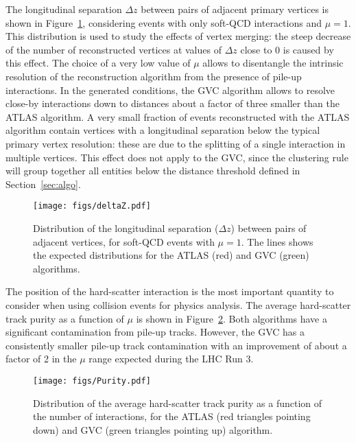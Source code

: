 \documentclass[a4paper,11pt]{article}
\begin{document}
The longitudinal separation $\Delta z$ between pairs of adjacent primary vertices is shown in Figure~\ref{fig:deltaZ}, considering events with only soft-QCD interactions and $\mu = 1$. This distribution is used to study the effects of vertex merging: the steep decrease of the number of reconstructed vertices at values of $\Delta z$ close to 0 is caused by this effect. The choice of a very low value of $\mu$ allows to disentangle the intrinsic resolution of the reconstruction algorithm from the presence of pile-up interactions. In the generated conditions, the GVC algorithm allows to resolve close-by interactions down to distances about a factor of three smaller than the ATLAS algorithm. A very small fraction of events reconstructed with the ATLAS algorithm contain vertices with a longitudinal separation below the typical primary vertex resolution: these are due to the splitting of a single interaction in multiple vertices. This effect does not apply to the GVC, since the clustering rule will group together all entities below the distance threshold defined in Section~\ref{sec:algo}.

\begin{figure}[htb!]
\begin{center}
\texttt{[image: figs/deltaZ.pdf]}
\end{center}
\caption{Distribution of the longitudinal separation ($\Delta z$) between pairs of adjacent vertices, for soft-QCD events with $\mu=1$. The lines shows the expected distributions for the ATLAS (red) and GVC (green) algorithms.} 
\label{fig:deltaZ}
\end{figure}

The position of the hard-scatter interaction is the most important quantity to consider when using collision events for physics analysis. The average hard-scatter track purity as a function of $\mu$ is shown in Figure~\ref{fig:PurityVsMu}. 
Both algorithms have a significant contamination from pile-up tracks. However, the GVC has a consistently smaller pile-up track contamination with an improvement of about a factor of 2 in the $\mu$ range expected during the LHC Run 3.

\begin{figure}[htb!]
\begin{center}
\texttt{[image: figs/Purity.pdf]}
\end{center}
\caption{Distribution of the average hard-scatter track purity as a function of the number of interactions, for the ATLAS (red triangles pointing down) and GVC (green triangles pointing up) algorithm.} 
\label{fig:PurityVsMu}
\end{figure}
\end{document}
